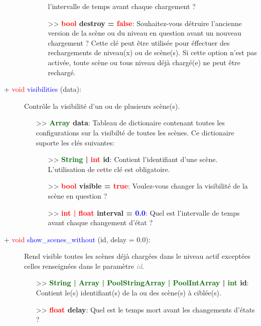\documentclass[a4paper, 11pt]{article}
\begin{document}
\begin{description}
\begin{itemize}
\begin{itemize}
				l'intervalle de temps avant chaque chargement ?\\
				\item[>> \textbf{\textcolor{red}{bool} destroy = \textcolor{red}{false}}:] Souhaitez-vous
				détruire l'ancienne version de la scène ou du niveau en question avant un nouveau chargement 
				? Cette clé peut être utilisée pour éffectuer des \\rechargements de niveau(x) ou de
				scène(s). Si cette option n'est pas activée, toute scène ou tous niveau déjà chargé(e) ne
				peut être rechargé.\\
			\end{itemize}
		\end{itemize}
	\end{description}
	\begin{description}
		\item [+ \textcolor{red}{void} \textcolor{blue}{visibilities} (data):] Contrôle la visibilité d'un 	
		ou de plusieurs scène(s).
		\begin{itemize}
			\item [>> \textbf{\textcolor{darkgreen}{Array} data}:] Tableau de dictionaire contenant toutes 
			les configurations sur la visibilté de toutes les scènes. Ce dictionaire suporte les clés 
			suivantes:
			\begin{itemize}
				\item[>> \textbf{\textcolor{darkgreen}{String} | \textcolor{red}{int} id}:] Contient
				l'identifiant d'une scène. L'utilisation de cette clé est obligatoire.
				\item[>> \textbf{\textcolor{red}{bool} visible = \textcolor{red}{true}}:] Voulez-vous 
				changer la visibilité de la scène en question ?
				\item[>> \textbf{\textcolor{red}{int | float} interval = \textcolor{blue}{0.0}}:] Quel est 
				l'intervalle de temps avant chaque changement d'état ?\\
			\end{itemize}
		\end{itemize}
	\end{description}
	\begin{description}
		\item [+ \textcolor{red}{void} \textcolor{blue}{show\_scenes\_without} (id, delay = 0.0):] Rend 
		visible toutes les scènes déjà chargées dans le niveau actif exceptées celles renseignées dans le 
		paramètre \textcolor{gray}{\textit{id}}.
		\begin{itemize}
			\item [>> \textbf{\textcolor{darkgreen}{String | Array | PoolStringArray | PoolIntArray} | 
			\textcolor{darkgreen}{int} id}:] Contient le(s) identifiant(s) de la ou des scène(s) à 
			ciblée(s).
			\item [>> \textbf{\textcolor{red}{float} delay}:] Quel est le temps mort avant les changements
			d'états ?\\
		\end{itemize}
	\end{description}
\end{document}
